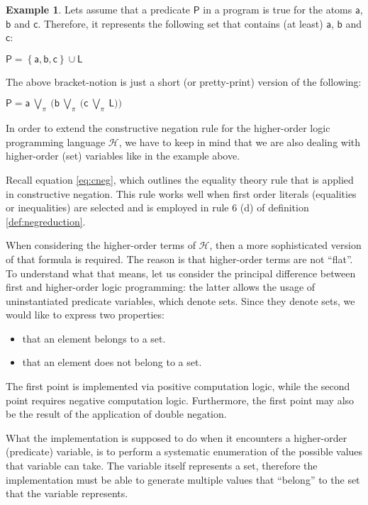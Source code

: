 \documentclass[inscr,ack,preface]{dithesis}
\theoremstyle{definition}
\newtheorem{example}{Example}[chapter]
\newcommand{\h}{$\mathcal{H}$}
\newcommand{\msf}[1]{$\mathsf{#1}$}
\begin{document}
\begin{example} Lets assume that a predicate \msf{P} in a program is true for the atoms \msf{a}, \msf{b} and \msf{c}. Therefore, it represents the following set that contains (at least) \msf{a}, \msf{b} and \msf{c}:
\begin{center}
  \msf{P = \left\{ a, b, c \right\} \cup L}
\end{center}

The above bracket-notion is just a short (or pretty-print) version of the following:
\begin{center}
  \msf{P = a ~\bigvee_{\pi}~ \big( b ~\bigvee_{\pi}~ \big( c ~\bigvee_{\pi}~ L \big) \big)}
\end{center}
\end{example}

In order to extend the constructive negation rule for the higher-order logic programming language \h{}, we have to keep in mind that we are also dealing with higher-order (set) variables like in the example above.

Recall equation \ref{eq:cneg}, which outlines the equality theory rule that is applied in constructive negation. This rule works well when first order literals (equalities or inequalities) are selected and is employed in rule 6 (d) of definition \ref{def:negreduction}.

When considering the higher-order terms of \h{}, then a more sophisticated version of that formula is required. The reason is that higher-order terms are not ``flat''. To understand what that means, let us consider the principal difference between first and higher-order logic programming: the latter allows the usage of uninstantiated predicate variables, which denote sets. Since they denote sets, we would like to express two properties:
\begin{itemize}
  \item that an element belongs to a set.
  \item that an element does not belong to a set.
\end{itemize}
The first point is implemented via positive computation logic, while the second point requires negative computation logic. Furthermore, the first point may also be the result of the application of double negation.

What the implementation is supposed to do when it encounters a higher-order (predicate) variable, is to perform a systematic enumeration of the possible values that variable can take. The variable itself represents a set, therefore the implementation must be able to generate multiple values that ``belong'' to the set that the variable represents.
\end{document}
